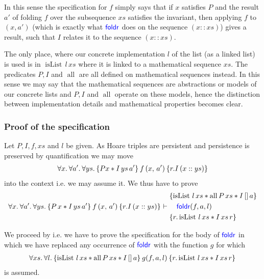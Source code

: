 In this sense the specification for $f$ simply says that if $x$ satisfies $P$ and the result $a'$ of folding $f$ over the subsequence $xs$ satisfies the invariant, then applying $f$ to $(x, a')$ (which is exactly what $\textsf{\color{blue} foldr}$ does on the sequence $(x::xs)$) gives a result, such that $I$ relates it to the sequence $(x::xs)$.

\begin{remark}
  The only place, where our concrete implementation $l$ of the list (as a linked list) is used is in $\operatorname{isList} \, l \, xs$ where it is linked to a mathematical sequence $xs$.
  The predicates $P, I$ and $\operatorname{all}$ are all defined on mathematical sequences instead.
  In this sense we may say that the mathematical sequences are abstractions or models of our concrete lists and $P, I$ and $\operatorname{all}$ operate on these models, hence the distinction between implementation details and mathematical properties becomes clear.
\end{remark}

\subsubsection*{Proof of the specification}
Let $P, I, f, xs$ and $l$ be given. As Hoare triples are persistent and persistence is preserved by quantification we may move 
\begin{align*}
\All x. \All a'. \All ys. \hoare{P x \ast I \, ys \, a'}{f \, (x, \, a')}{r. I\, (x::ys)}
 \end{align*} 
 into the context i.e. we may assume it. We thus have to prove
\begin{align*}
\All x. \All a'. \All ys. \hoare{P \, x \ast I \, ys \, a'}{f \, (x, \, a')}{r. I\, (x::ys)}
\proves \hoareV
{ \operatorname{isList} \, l\, xs \ast \operatorname{all} P \, xs \ast  I \, [] \, a}
{\langkw{foldr}(f, a, l)}
{r.  \operatorname{isList} \, l \, xs \ast I \, xs\, r}
\end{align*}

We proceed by  i.e. we have to prove the specification for the body of $\textsf{\color{blue} foldr}$ in which we have replaced any occurrence of $\textsf{\color{blue} foldr}$ with the function $g$ for which
\begin{align*}
\All xs. \All l. \hoare{ \operatorname{isList} \, l\, xs \ast \operatorname{all} P \, xs \ast  I \, [] \, a}
 {g(f, a, l)}
{r.  \operatorname{isList} \, l \, xs \ast I \, xs\, r}
\end{align*}
is assumed.

